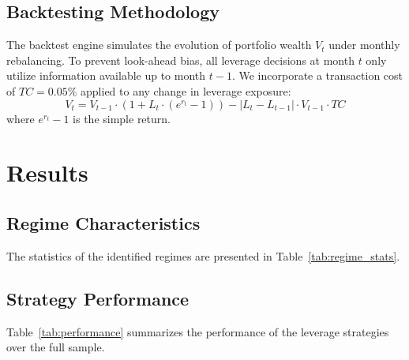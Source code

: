 \documentclass[11pt]{article}
\begin{document}
\subsection{Backtesting Methodology}
The backtest engine simulates the evolution of portfolio wealth $V_t$ under monthly rebalancing. To prevent look-ahead bias, all leverage decisions at month $t$ only utilize information available up to month $t-1$. We incorporate a transaction cost of $TC = 0.05\%$ applied to any change in leverage exposure:
\begin{equation}
V_t = V_{t-1} \cdot (1 + L_t \cdot (e^{r_t} - 1)) - |L_t - L_{t-1}| \cdot V_{t-1} \cdot TC
\end{equation}
where $e^{r_t}-1$ is the simple return.

\section{Results}

\subsection{Regime Characteristics}
The statistics of the identified regimes are presented in Table~\ref{tab:regime_stats}.


\subsection{Strategy Performance}
Table~\ref{tab:performance} summarizes the performance of the leverage strategies over the full sample.
\end{document}
